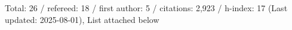 Total: 26 / refereed: 18 / first author: 5 / citations: 2,923 / h-index: 17 (Last updated: 2025-08-01), List attached below